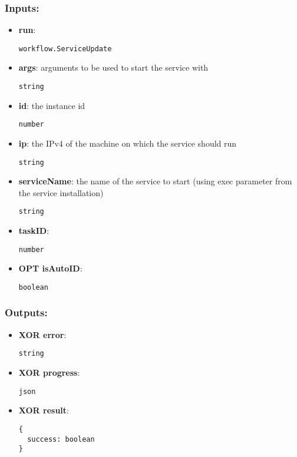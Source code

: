 \subsubsection*{Inputs:}
\begin{itemize}
    \item \textbf{run}: 
\begin{lstlisting}
workflow.ServiceUpdate
\end{lstlisting}
    \item \textbf{args}: arguments to be used to start the service with
\begin{lstlisting}
string
\end{lstlisting}
    \item \textbf{id}: the instance id
\begin{lstlisting}
number
\end{lstlisting}
    \item \textbf{ip}: the IPv4 of the machine on which the service should run
\begin{lstlisting}
string
\end{lstlisting}
    \item \textbf{serviceName}: the name of the service to start (using exec parameter from the service installation)
\begin{lstlisting}
string
\end{lstlisting}
    \item \textbf{taskID}: 
\begin{lstlisting}
number
\end{lstlisting}
    \item \textbf{OPT isAutoID}: 
\begin{lstlisting}
boolean
\end{lstlisting}
  \end{itemize}

\subsubsection*{Outputs:}
\begin{itemize}
    \item \textbf{XOR error}: 
\begin{lstlisting}
string
\end{lstlisting}
    \item \textbf{XOR progress}: 
\begin{lstlisting}
json
\end{lstlisting}
    \item \textbf{XOR result}: 
\begin{lstlisting}
{
  success: boolean
}
\end{lstlisting}
  \end{itemize}

